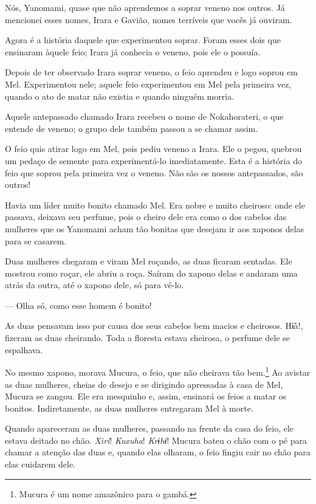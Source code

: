 Nós, Yanomami, quase que não aprendemos a soprar veneno nos outros. Já
mencionei esses nomes, Irara e Gavião, nomes terríveis que vocês já
ouviram. 

Agora é a história daquele que experimentou soprar. Foram esses dois que
ensinaram àquele feio; Irara já conhecia o veneno, pois ele o possuía. 

Depois de ter observado Irara soprar veneno, o feio aprendeu e logo
soprou em Mel. Experimentou nele; aquele feio experimentou em Mel pela
primeira vez, quando o ato de matar não existia e quando ninguém
morria. 

Aquele antepassado chamado Irara recebeu o nome de Nokahorateri, o que
entende de veneno; o grupo dele também passou a se chamar assim. 

O feio quis atirar logo em Mel, pois pediu veneno a Irara. Ele o pegou,
quebrou um pedaço de semente para experimentá-lo imediatamente. Esta é a
história do feio que soprou pela primeira vez o veneno. Não são os
nossos antepassados, são outros! 

Havia um líder muito bonito chamado Mel. Era nobre e muito cheiroso:
onde ele passava, deixava seu perfume, pois o cheiro dele era como o dos
cabelos das mulheres que os Yanomami acham tão bonitas que desejam
ir aos xaponos delas para se casarem.

Duas mulheres chegaram e viram Mel roçando, as duas ficaram sentadas. Ele
mostrou como roçar, ele abriu a roça. Saíram do xapono delas e andaram uma
atrás da outra, até o xapono dele, só para vê-lo. 

--- Olha só, como esse homem é bonito! 

As duas pensavam isso por causa dos seus cabelos bem macios e
cheirosos. Hɨ̃a!, fizeram as duas cheirando. Toda a floresta
estava cheirosa, o perfume dele se espalhava. 

No mesmo xapono, morava Mucura, o feio, que não cheirava tão bem.\footnote{Mucura é um nome amazônico para o gambá.} Ao avistar as duas mulheres, cheias de desejo e se
dirigindo apressadas à casa de Mel, Mucura se zangou. Ele era mesquinho
e, assim, ensinará os feios a matar os bonitos. Indiretamente, as
duas mulheres entregaram Mel à morte. 

Quando apareceram as duas mulheres, passando na frente da casa do feio,
ele estava deitado no chão. \textit{Xiri}! \textit{Kuxuha}! \textit{Krɨhɨ}! Mucura bateu o chão com o pé para chamar a atenção das duas e, quando elas olharam, o feio fingiu cair no chão para elas cuidarem dele.

